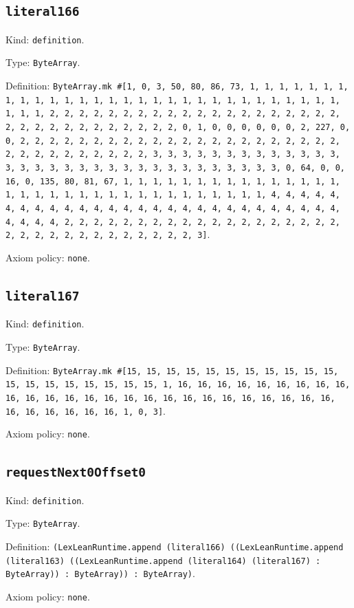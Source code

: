 \documentclass[11pt]{article}
\begin{document}
\subsection*{\texttt{literal166}}
\noindent Kind: \texttt{definition}.\par
\noindent Type: \texttt{ByteArray}.\par
\noindent Definition: \texttt{ByteArray.mk \#[1, 0, 3, 50, 80, 86, 73, 1, 1, 1, 1, 1, 1, 1, 1, 1, 1, 1, 1, 1, 1, 1, 1, 1, 1, 1, 1, 1, 1, 1, 1, 1, 1, 1, 1, 1, 1, 1, 1, 1, 2, 2, 2, 2, 2, 2, 2, 2, 2, 2, 2, 2, 2, 2, 2, 2, 2, 2, 2, 2, 2, 2, 2, 2, 2, 2, 2, 2, 2, 2, 2, 2, 0, 1, 0, 0, 0, 0, 0, 0, 2, 227, 0, 0, 2, 2, 2, 2, 2, 2, 2, 2, 2, 2, 2, 2, 2, 2, 2, 2, 2, 2, 2, 2, 2, 2, 2, 2, 2, 2, 2, 2, 2, 2, 2, 2, 3, 3, 3, 3, 3, 3, 3, 3, 3, 3, 3, 3, 3, 3, 3, 3, 3, 3, 3, 3, 3, 3, 3, 3, 3, 3, 3, 3, 3, 3, 3, 3, 0, 64, 0, 0, 16, 0, 135, 80, 81, 67, 1, 1, 1, 1, 1, 1, 1, 1, 1, 1, 1, 1, 1, 1, 1, 1, 1, 1, 1, 1, 1, 1, 1, 1, 1, 1, 1, 1, 1, 1, 1, 1, 1, 4, 4, 4, 4, 4, 4, 4, 4, 4, 4, 4, 4, 4, 4, 4, 4, 4, 4, 4, 4, 4, 4, 4, 4, 4, 4, 4, 4, 4, 4, 4, 4, 2, 2, 2, 2, 2, 2, 2, 2, 2, 2, 2, 2, 2, 2, 2, 2, 2, 2, 2, 2, 2, 2, 2, 2, 2, 2, 2, 2, 2, 2, 2, 2, 3]}.\par
\noindent Axiom policy: \texttt{none}.\par
\subsection*{\texttt{literal167}}
\noindent Kind: \texttt{definition}.\par
\noindent Type: \texttt{ByteArray}.\par
\noindent Definition: \texttt{ByteArray.mk \#[15, 15, 15, 15, 15, 15, 15, 15, 15, 15, 15, 15, 15, 15, 15, 15, 15, 15, 15, 1, 16, 16, 16, 16, 16, 16, 16, 16, 16, 16, 16, 16, 16, 16, 16, 16, 16, 16, 16, 16, 16, 16, 16, 16, 16, 16, 16, 16, 16, 16, 16, 16, 1, 0, 3]}.\par
\noindent Axiom policy: \texttt{none}.\par
\subsection*{\texttt{requestNext0Offset0}}
\noindent Kind: \texttt{definition}.\par
\noindent Type: \texttt{ByteArray}.\par
\noindent Definition: \texttt{(LexLeanRuntime.append (literal166) ((LexLeanRuntime.append (literal163) ((LexLeanRuntime.append (literal164) (literal167) : ByteArray)) : ByteArray)) : ByteArray)}.\par
\noindent Axiom policy: \texttt{none}.\par
\end{document}
